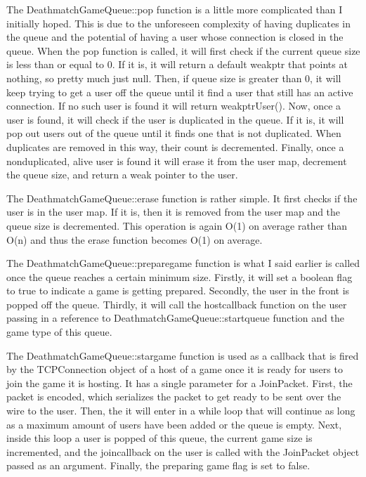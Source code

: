 \documentclass[conference]{IEEEtran}
\begin{document}
The DeathmatchGameQueue::pop function is a little more complicated than I initially hoped.
This is due to the unforeseen complexity of having duplicates in the queue and the potential of having a user whose connection is closed in the queue.
When the pop function is called, it will first check if the current queue size is less than or equal to 0.
If it is, it will return a default weak\textunderscore ptr that points at nothing, so pretty much just null.
Then, if queue size is greater than 0, it will keep trying to get a user off the queue until it find a user that still has an active connection.
If no such user is found it will return weak\textunderscore ptr\textlangle User\textrangle ().
Now, once a user is found, it will check if the user is duplicated in the queue.
If it is, it will pop out users out of the queue until it finds one that is not duplicated.
When duplicates are removed in this way, their count is decremented.
Finally, once a nonduplicated, alive user is found it will erase it from the user map, decrement the queue size, and return a weak pointer to the user.

The DeathmatchGameQueue::erase function is rather simple.
It first checks if the user is in the user map.
If it is, then it is removed from the user map and the queue size is decremented.
This operation is again O(1) on average rather than O(n) and thus the erase function becomes O(1) on average.

The DeathmatchGameQueue::prepare\textunderscore game function is what I said earlier is called once the queue reaches a certain minimum size.
Firstly, it will set a boolean flag to true to indicate a game is getting prepared.
Secondly, the user in the front is popped off the queue.
Thirdly, it will call the host\textunderscore callback function on the user passing in a reference to DeathmatchGameQueue::start\textunderscore queue function and the game type of this queue.

The DeathmatchGameQueue::star\textunderscore game function is used as a callback that is fired by the TCPConnection object of a host of a game once it is ready for users to join the game it is hosting.
It has a single parameter for a JoinPacket.
First, the packet is encoded, which serializes the packet to get ready to be sent over the wire to the user.
Then, the it will enter in a while loop that will continue as long as a maximum amount of users have been added or the queue is empty.
Next, inside this loop a user is popped of this queue, the current game size is incremented, and the join\textunderscore callback on the user is called with the JoinPacket object passed as an argument.
Finally, the preparing game flag is set to false.
\end{document}
